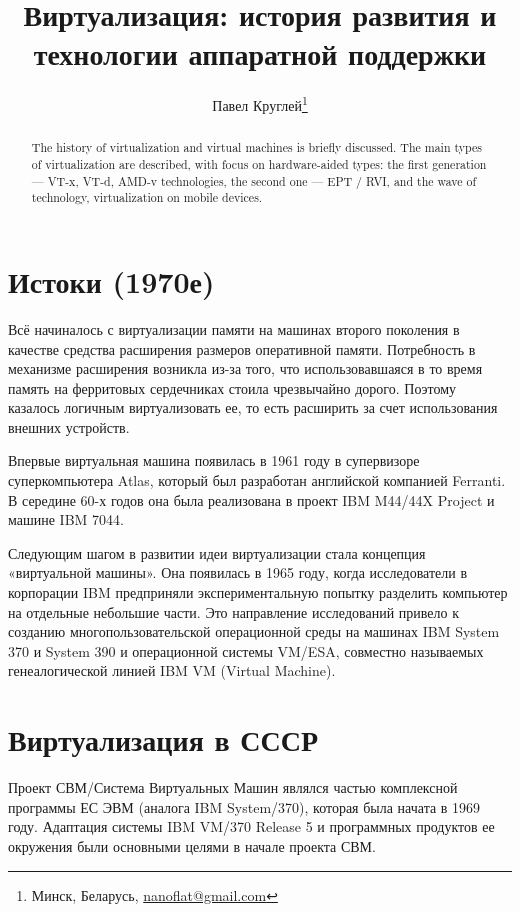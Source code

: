 \documentclass[10pt, a5paper]{article}
\begin{document}
\title{Виртуализация: история развития и технологии аппаратной поддержки}
\author{Павел Круглей\footnote{Минск, Беларусь, \url{nanoflat@gmail.com}}}
\date{}
\maketitle

\begin{abstract}
The history of virtualization and virtual machines is briefly discussed. The main types of virtualization are described, with focus on hardware-aided types: the first generation --- VT-x, VT-d, AMD-v technologies, the second one --- EPT / RVI, and the wave of technology, virtualization on mobile devices.\end{abstract}

\section*{Истоки (1970е)}
Всё начиналось с виртуализации памяти на машинах второго поколения в качестве средства расширения размеров оперативной памяти. Потребность в механизме расширения возникла из-за того, что использовавшаяся в то время память на ферритовых сердечниках стоила чрезвычайно дорого. Поэтому казалось логичным виртуализовать ее, то есть расширить за счет использования внешних устройств.

Впервые виртуальная машина появилась в 1961 году в супервизоре суперкомпьютера Atlas, который был разработан английской компанией Ferranti. В середине 60-х годов она была реализована в проект IBM M44/44X Project и машине IBM 7044. 

Следующим шагом в развитии идеи виртуализации стала концепция «виртуальной машины». Она появилась в 1965 году, когда исследователи в корпорации IBM предприняли экспериментальную попытку разделить компьютер на отдельные небольшие части. Это направление исследований привело к созданию многопользовательской операционной среды на машинах IBM System 370 и System 390 и операционной системы VM/ESA, совместно называемых генеалогической линией IBM VM (Virtual Machine). 

\section*{Виртуализация в СССР}

Проект СВМ/Система Виртуальных Машин являлся частью \linebreak комплексной программы ЕС ЭВМ (аналога IBM System/370), которая была начата в 1969 году. Адаптация системы IBM VM/370 Release 5 и программных продуктов ее окружения были основными целями в начале проекта СВМ.
\end{document}
